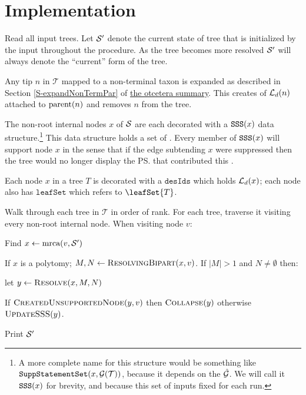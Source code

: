 \documentclass[11pt]{article}
\newcommand{\summDoc}{\href{http://phylo.bio.ku.edu/ot/summarizing-taxonomy-plus-trees.pdf}{the otcetera summary}\xspace}
\newcommand{\summRef}[1]{Section \ref{S-#1} of \summDoc}
\begin{document}
\section*{Implementation}
\begin{compactenum}
    \item Read all input trees. Let $\mathcal{S}^{\prime}$ denote the current state of tree that is initialized by the input
    \summaryTree throughout the procedure. 
    As the tree becomes more resolved $\mathcal{S}^{\prime}$ will always denote the ``current'' form of the tree.
    \item Any tip $n$ in $\mathcal{T}$ mapped to a non-terminal taxon is expanded as described in \summRef{expandNonTermPar}.
    This creates of $\mathcal{L}_d(n)$ attached to $\mbox{parent}(n)$ and removes $n$ from the tree.
    \item The non-root internal nodes $x$ of $\mathcal{S}$ are each decorated with a  $\mbox{\texttt{SSS}}(x)$ data structure.\footnote{A
    more complete name for this structure would be something like $\mbox{\texttt{SuppStatementSet}}(x, \mathcal{G}(\mathcal{T}))$,
    because it depends on the $\hat{\mathcal{G}}$.
    We will call it $\mbox{\texttt{SSS}}(x)$ for brevity, and because this set of inputs fixed for each run.}
    This data structure holds a set of  {\incLSSSs}.
    Every member of $\mbox{\texttt{SSS}}(x)$ will support node $x$ in the
    sense that if the edge subtending $x$ were suppressed then the tree would no longer 
    display the \ps that contributed this \incLSSS.
    \item Each node $x$ in a tree $T$ is decorated with a $\texttt{desIds}$ which holds $\mathcal{L}_d(x)$;
    each node also has $\texttt{leafSet}$ which refers to $\leafSet{T}$.
    \item Walk through each tree in $\mathcal{T}$ in order of rank. For each tree, 
    traverse it visiting every non-root internal node.
    When visiting node $v$:
    \begin{compactenum}
        \item Find $x \leftarrow \mbox{mrca}(v, \mathcal{S}^{\prime})$
        \item If $x$ is a polytomy; $M, N \leftarrow \textsc{ResolvingBipart}(x, v)$. If $|M| > 1$ and $N\neq \emptyset$ then:
         \begin{compactenum}
            \item let $y\leftarrow \textsc{Resolve}(x, M, N)$
            \item If $\textsc{CreatedUnsupportedNode}(y, v)$ then $\textsc{Collapse}(y)$ otherwise $\textsc{UpdateSSS}(y)$.
        \end{compactenum}
   \end{compactenum}
   \item Print $\mathcal{S}^{\prime}$
\end{compactenum}
\end{document}
